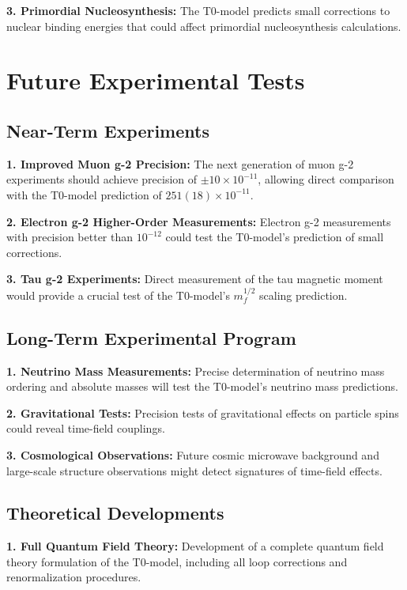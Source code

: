 \documentclass[12pt,a4paper]{article}
\begin{document}
	\textbf{3. Primordial Nucleosynthesis:}
	The T0-model predicts small corrections to nuclear binding energies that could affect primordial nucleosynthesis calculations.
	
	\section{Future Experimental Tests}
	
	\subsection{Near-Term Experiments}
	
	\textbf{1. Improved Muon g-2 Precision:}
	The next generation of muon g-2 experiments should achieve precision of $\pm 10 \times 10^{-11}$, allowing direct comparison with the T0-model prediction of $251(18) \times 10^{-11}$.
	
	\textbf{2. Electron g-2 Higher-Order Measurements:}
	Electron g-2 measurements with precision better than $10^{-12}$ could test the T0-model's prediction of small corrections.
	
	\textbf{3. Tau g-2 Experiments:}
	Direct measurement of the tau magnetic moment would provide a crucial test of the T0-model's $m_f^{1/2}$ scaling prediction.
	
	\subsection{Long-Term Experimental Program}
	
	\textbf{1. Neutrino Mass Measurements:}
	Precise determination of neutrino mass ordering and absolute masses will test the T0-model's neutrino mass predictions.
	
	\textbf{2. Gravitational Tests:}
	Precision tests of gravitational effects on particle spins could reveal time-field couplings.
	
	\textbf{3. Cosmological Observations:}
	Future cosmic microwave background and large-scale structure observations might detect signatures of time-field effects.
	
	\subsection{Theoretical Developments}
	
	\textbf{1. Full Quantum Field Theory:}
	Development of a complete quantum field theory formulation of the T0-model, including all loop corrections and renormalization procedures.
	
\end{document}
